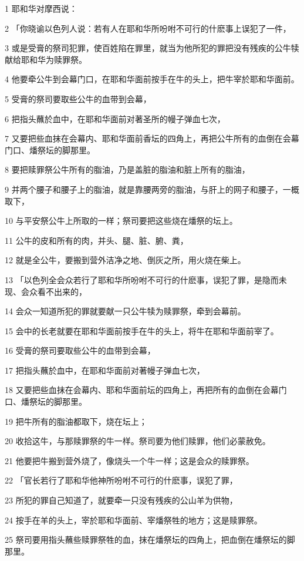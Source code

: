 \par 1 耶和华对摩西说：
\par 2 「你晓谕以色列人说：若有人在耶和华所吩咐不可行的什麽事上误犯了一件，
\par 3 或是受膏的祭司犯罪，使百姓陷在罪里，就当为他所犯的罪把没有残疾的公牛犊献给耶和华为赎罪祭。
\par 4 他要牵公牛到会幕门口，在耶和华面前按手在牛的头上，把牛宰於耶和华面前。
\par 5 受膏的祭司要取些公牛的血带到会幕，
\par 6 把指头蘸於血中，在耶和华面前对著圣所的幔子弹血七次，
\par 7 又要把些血抹在会幕内、耶和华面前香坛的四角上，再把公牛所有的血倒在会幕门口、燔祭坛的脚那里。
\par 8 要把赎罪祭公牛所有的脂油，乃是盖脏的脂油和脏上所有的脂油，
\par 9 并两个腰子和腰子上的脂油，就是靠腰两旁的脂油，与肝上的网子和腰子，一概取下，
\par 10 与平安祭公牛上所取的一样；祭司要把这些烧在燔祭的坛上。
\par 11 公牛的皮和所有的肉，并头、腿、脏、腑、粪，
\par 12 就是全公牛，要搬到营外洁净之地、倒灰之所，用火烧在柴上。
\par 13 「以色列全会众若行了耶和华所吩咐不可行的什麽事，误犯了罪，是隐而未现、会众看不出来的，
\par 14 会众一知道所犯的罪就要献一只公牛犊为赎罪祭，牵到会幕前。
\par 15 会中的长老就要在耶和华面前按手在牛的头上，将牛在耶和华面前宰了。
\par 16 受膏的祭司要取些公牛的血带到会幕，
\par 17 把指头蘸於血中，在耶和华面前对著幔子弹血七次，
\par 18 又要把些血抹在会幕内、耶和华面前坛的四角上，再把所有的血倒在会幕门口、燔祭坛的脚那里。
\par 19 把牛所有的脂油都取下，烧在坛上；
\par 20 收拾这牛，与那赎罪祭的牛一样。祭司要为他们赎罪，他们必蒙赦免。
\par 21 他要把牛搬到营外烧了，像烧头一个牛一样；这是会众的赎罪祭。
\par 22 「官长若行了耶和华他神所吩咐不可行的什麽事，误犯了罪，
\par 23 所犯的罪自己知道了，就要牵一只没有残疾的公山羊为供物，
\par 24 按手在羊的头上，宰於耶和华面前、宰燔祭牲的地方；这是赎罪祭。
\par 25 祭司要用指头蘸些赎罪祭牲的血，抹在燔祭坛的四角上，把血倒在燔祭坛的脚那里。
